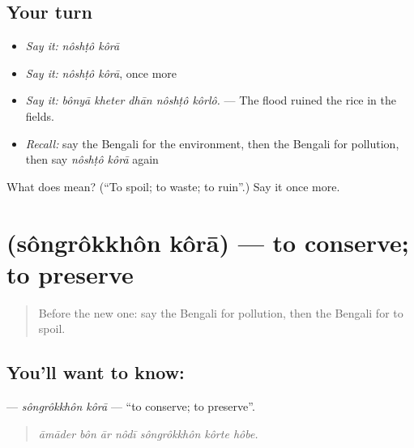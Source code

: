 \subsection*{Your turn}
\begin{itemize}
\raggedright
  \item \emph{Say it:} \emph{nôshṭô kôrā}
  \item \emph{Say it:} \emph{nôshṭô kôrā}, once more
  \item \emph{Say it:} \emph{bônyā kheter dhān nôshṭô kôrlô.} — The flood ruined the rice in the fields.
  \item \emph{Recall:} say the Bengali for the environment, then the Bengali for pollution, then say \emph{nôshṭô kôrā} again
\end{itemize}

\begin{tcolorbox}[breakable,colback=teal!4,colframe=teal!35!black,title={Before you move on}]
What does   mean? (\textquotedblleft{}To spoil; to waste; to ruin\textquotedblright{}.) Say it once more.
\end{tcolorbox}
\section[\texorpdfstring{\bn{সংরক্ষণ} \bn{করা} (sôngrôkkhôn kôrā)}{সংরক্ষণ করা (sôngrôkkhôn kôrā)}]{  (sôngrôkkhôn kôrā) — to conserve; to preserve}

\label{lesson:BN-C434-songrokkhon-kora}



\begin{quote}
Before the new one: say the Bengali for pollution, then the Bengali for to spoil.
\end{quote}

\subsection*{You'll want to know:  }
\textbf{ } — \emph{sôngrôkkhôn kôrā} — \textquotedblleft{}to conserve; to preserve\textquotedblright{}.

\begin{quote}
      
\end{quote}

\begin{quote}
\emph{āmāder bôn ār nôdī sôngrôkkhôn kôrte hôbe.}
\end{quote}

